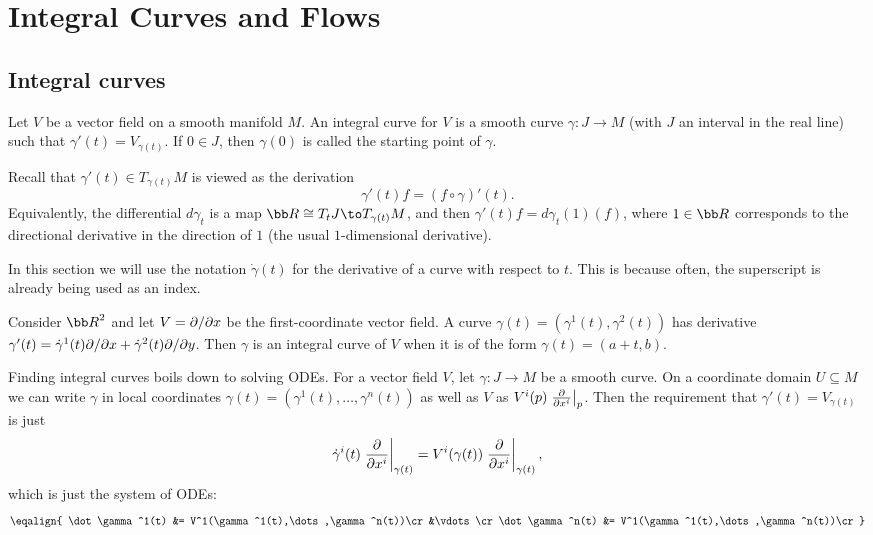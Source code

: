 \section{Integral Curves and Flows}

\subsection{Integral curves}

\bdefn

    Let $V$ be a vector field on a smooth manifold $M$.
    An {\emphcolor integral curve} for $V$ is a smooth curve $\gamma\colon J\to M$ (with $J$ an interval in the real line)
    such that $\gamma'(t)=V_{\gamma(t)}$.
    If $0\in J$, then $\gamma(0)$ is called the {\emphcolor starting point} of $\gamma$.

\edefn

Recall that $\gamma'(t)\in T_{\gamma(t)}M$ is viewed as the derivation
$$ \gamma'(t)f = (f\circ\gamma)'(t) . $$
Equivalently, the differential $d\gamma_t$ is a map $\bR\cong T_tJ\to T_{\gamma(t)}M$, and then $\gamma'(t)f=d\gamma_t(1)(f)$, where $1\in\bR$
corresponds to the directional derivative in the direction of $1$ (the usual $1$-dimensional derivative).

\bnote

    In this section we will use the notation $\dot\gamma(t)$ for the derivative of a curve with respect to $t$.
    This is because often, the superscript is already being used as an index.

\enote

\bexam

    Consider $\bR^2$ and let $V=\partial /\partial x$ be the first-coordinate vector field.
    A curve $\gamma(t)=(\gamma^1(t),\gamma^2(t))$ has derivative $\gamma'(t)=\dot\gamma^1(t)\partial /\partial x+\dot\gamma^2(t)\partial /\partial y$.
    Then $\gamma$ is an integral curve of $V$ when it is of the form $\gamma(t)=(a+t,b)$.

\eexam

Finding integral curves boils down to solving ODEs.
For a vector field $V$, let $\gamma\colon J\to M$ be a smooth curve.
On a coordinate domain $U\subseteq M$ we can write $\gamma$ in local coordinates $\gamma(t)=(\gamma^1(t),\dots,\gamma^n(t))$ as well as
$V$ as $V^i(p)\left.{{\partial }\over{\partial x^i}}\right|_p$.
Then the requirement that $\gamma'(t)=V_{\gamma(t)}$ is just
$$ \dot\gamma^i(t)\left.{{\partial }\over{\partial x^i}}\right|_{\gamma(t)} = V^i(\gamma(t))\left.{{\partial }\over{\partial x^i}}\right|_{\gamma(t)} , $$
which is just the system of ODEs:
$$ \eqalign{
    \dot\gamma^1(t) &= V^1(\gamma^1(t),\dots,\gamma^n(t))\cr
    &\vdots\cr
    \dot\gamma^n(t) &= V^1(\gamma^1(t),\dots,\gamma^n(t))\cr
} $$

